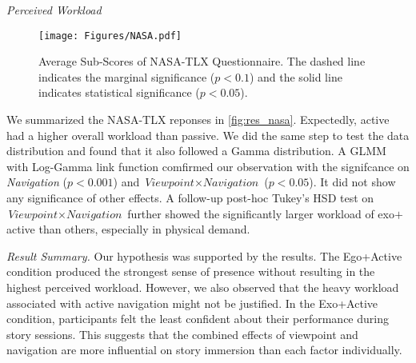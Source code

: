 \textit{Perceived Workload}
\begin{figure*}[t]
\centering
  \texttt{[image: Figures/NASA.pdf]}
  \caption{Average Sub-Scores of NASA-TLX Questionnaire. The dashed line indicates the marginal significance ($p < 0.1$) and the solid line indicates statistical significance ($p < 0.05$).}
  \label{fig:res_nasa}
\end{figure*}
We summarized the NASA-TLX reponses in \autoref{fig:res_nasa}. Expectedly, active had a higher overall workload than passive. 
We did the same step to test the data distribution and found that it also followed a Gamma distribution.
A GLMM with Log-Gamma link function comfirmed our observation with the signifcance on \textit{Navigation} ($p < 0.001$) and $\textit{Viewpoint} \times \textit{Navigation}$ ($p < 0.05$). It did not show any significance of other effects.
A follow-up post-hoc Tukey's HSD test on $\textit{Viewpoint} \times \textit{Navigation}$ further showed the significantly larger workload of exo$+$active than others, especially in physical demand.

{\textit{Result Summary.} Our hypothesis was supported by the results. The Ego+Active condition produced the strongest sense of presence without resulting in the highest perceived workload. However, we also observed that the heavy workload associated with active navigation might not be justified. In the Exo+Active condition, participants felt the least confident about their performance during story sessions. This suggests that the combined effects of viewpoint and navigation are more influential on story immersion than each factor individually.}




